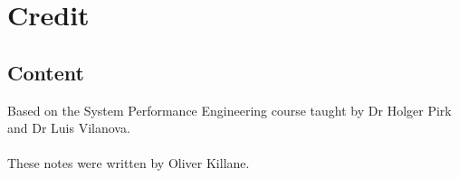 \chapter{Credit}

\section*{Content}
Based on the System Performance Engineering course taught by Dr Holger Pirk and Dr Luis Vilanova.
\\
\\ These notes were written by Oliver Killane.